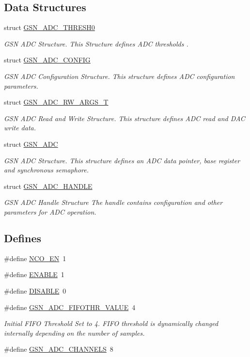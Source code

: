 \subsection*{Data Structures}
\begin{DoxyCompactItemize}
\item 
struct \hyperlink{a00026}{GSN\_\-ADC\_\-THRESH0}
\begin{DoxyCompactList}\small\item\em GSN ADC Structure. This Structure defines ADC thresholds . \end{DoxyCompactList}\item 
struct \hyperlink{a00023}{GSN\_\-ADC\_\-CONFIG}
\begin{DoxyCompactList}\small\item\em GSN ADC Configuration Structure. This structure defines ADC configuration parameters. \end{DoxyCompactList}\item 
struct \hyperlink{a00025}{GSN\_\-ADC\_\-RW\_\-ARGS\_\-T}
\begin{DoxyCompactList}\small\item\em GSN ADC Read and Write Structure. This structure defines ADC read and DAC write data. \end{DoxyCompactList}\item 
struct \hyperlink{a00022}{GSN\_\-ADC}
\begin{DoxyCompactList}\small\item\em GSN ADC Structure. This structure defines an ADC data pointer, base register and synchronous semaphore. \end{DoxyCompactList}\item 
struct \hyperlink{a00024}{GSN\_\-ADC\_\-HANDLE}
\begin{DoxyCompactList}\small\item\em GSN ADC Handle Structure The handle contains configuration and other parameters for ADC operation. \end{DoxyCompactList}\end{DoxyCompactItemize}
\subsection*{Defines}
\begin{DoxyCompactItemize}
\item 
\#define \hyperlink{a00474_ab8fd0009fa6d35ff704fc41da883e0af}{NCO\_\-EN}~1
\item 
\#define \hyperlink{a00474_a514ad415fb6125ba296793df7d1a468a}{ENABLE}~1
\item 
\#define \hyperlink{a00474_a99496f7308834e8b220f7894efa0b6ab}{DISABLE}~0
\item 
\#define \hyperlink{a00643_ga757ecde6d25c53dab837e48c83a16b46}{GSN\_\-ADC\_\-FIFOTHR\_\-VALUE}~4
\begin{DoxyCompactList}\small\item\em Initial FIFO Threshold Set to 4. FIFO threshold is dynamically changed internally depending on the number of samples. \end{DoxyCompactList}\item 
\#define \hyperlink{a00474_afc1cf9ba2cb95df9f7de39a82bbf512f}{GSN\_\-ADC\_\-CHANNELS}~8
\end{DoxyCompactItemize}
